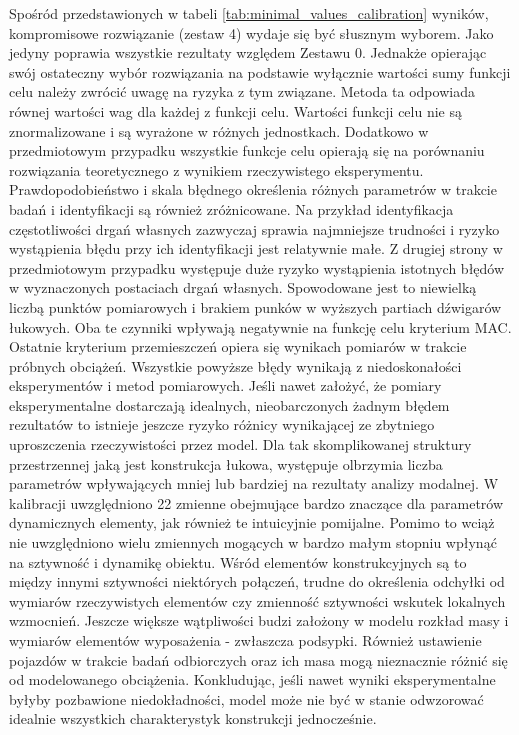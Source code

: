 Spośród przedstawionych w tabeli \ref{tab:minimal_values_calibration} wyników, kompromisowe rozwiązanie (zestaw 4) wydaje się być słusznym wyborem. Jako jedyny poprawia wszystkie rezultaty względem Zestawu 0. Jednakże opierając swój ostateczny wybór rozwiązania na podstawie wyłącznie wartości sumy funkcji celu należy zwrócić uwagę na ryzyka z tym związane. Metoda ta odpowiada równej wartości wag dla każdej z funkcji celu. Wartości funkcji celu nie są znormalizowane i są wyrażone w różnych jednostkach. Dodatkowo w przedmiotowym przypadku wszystkie funkcje celu opierają się na porównaniu rozwiązania teoretycznego z wynikiem rzeczywistego eksperymentu. Prawdopodobieństwo i skala błędnego określenia różnych parametrów w trakcie badań i identyfikacji są również zróżnicowane. Na przykład identyfikacja częstotliwości drgań własnych zazwyczaj sprawia najmniejsze trudności i ryzyko wystąpienia błędu przy ich identyfikacji jest relatywnie małe. Z drugiej strony w przedmiotowym przypadku występuje duże ryzyko wystąpienia istotnych błędów w wyznaczonych postaciach drgań własnych. Spowodowane jest to niewielką liczbą punktów pomiarowych i brakiem punków w wyższych partiach dźwigarów łukowych. Oba te czynniki wpływają negatywnie na funkcję celu kryterium MAC. Ostatnie kryterium przemieszczeń opiera się wynikach pomiarów w trakcie próbnych obciążeń. Wszystkie powyższe błędy wynikają z niedoskonałości eksperymentów i metod pomiarowych. Jeśli nawet założyć, że pomiary eksperymentalne dostarczają idealnych, nieobarczonych żadnym błędem rezultatów to istnieje jeszcze ryzyko różnicy wynikającej ze zbytniego uproszczenia rzeczywistości przez model. Dla tak skomplikowanej struktury przestrzennej jaką jest konstrukcja łukowa, występuje olbrzymia liczba parametrów wpływających mniej lub bardziej na rezultaty analizy modalnej. W kalibracji uwzględniono 22 zmienne obejmujące bardzo znaczące dla parametrów dynamicznych elementy, jak również te intuicyjnie pomijalne. Pomimo to wciąż nie uwzględniono wielu zmiennych mogących w bardzo małym stopniu wpłynąć na sztywność i dynamikę obiektu. Wśród elementów konstrukcyjnych są to między innymi sztywności niektórych połączeń, trudne do określenia odchyłki od wymiarów rzeczywistych elementów czy zmienność sztywności wskutek lokalnych wzmocnień. Jeszcze większe wątpliwości budzi założony w modelu rozkład masy i wymiarów elementów wyposażenia - zwłaszcza podsypki. Również ustawienie pojazdów w trakcie badań odbiorczych oraz ich masa mogą nieznacznie różnić się od modelowanego obciążenia. Konkludując, jeśli nawet wyniki eksperymentalne byłyby pozbawione niedokładności, model może nie być w stanie odwzorować idealnie wszystkich charakterystyk konstrukcji jednocześnie.

